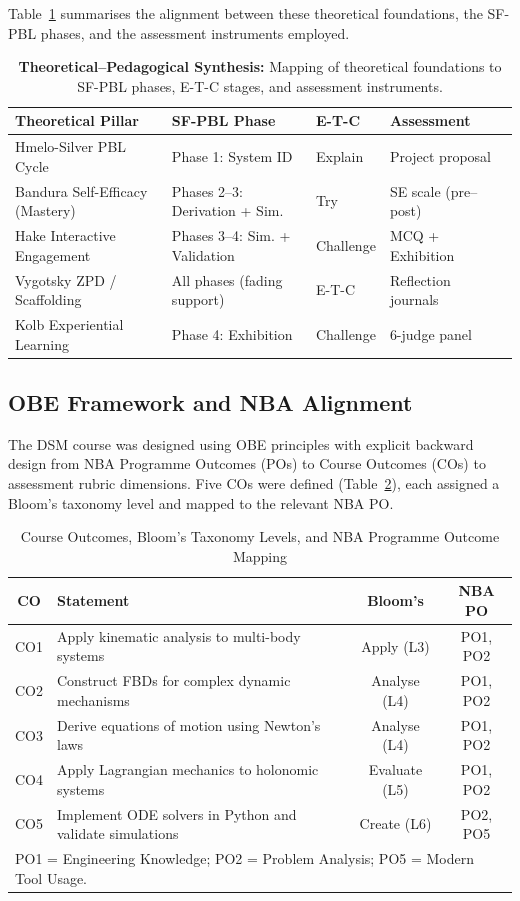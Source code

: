 \documentclass[utf8]{FrontiersinHarvard}
\begin{document}
{\color{blue} Table~\ref{tab:synthesis} summarises the alignment between these theoretical
foundations, the SF-PBL phases, and the assessment instruments employed.}

\begin{table}[h]
\caption{\textbf{Theoretical--Pedagogical Synthesis:} Mapping of theoretical
foundations to SF-PBL phases, E-T-C stages, and assessment instruments.}
\label{tab:synthesis}
\begin{tabular}{lllll}
\toprule
\textbf{Theoretical Pillar} & \textbf{SF-PBL Phase} & \textbf{E-T-C} & \textbf{Assessment} \\
\midrule
Hmelo-Silver PBL Cycle         & Phase 1: System ID       & Explain   & Project proposal  \\
Bandura Self-Efficacy (Mastery) & Phases 2--3: Derivation + Sim. & Try & SE scale (pre--post) \\
Hake Interactive Engagement    & Phases 3--4: Sim. + Validation & Challenge & MCQ + Exhibition  \\
Vygotsky ZPD / Scaffolding     & All phases (fading support)    & E-T-C     & Reflection journals \\
Kolb Experiential Learning     & Phase 4: Exhibition            & Challenge & 6-judge panel      \\
\bottomrule
\end{tabular}
\end{table}

\subsection{OBE Framework and NBA Alignment}

The DSM course was designed using OBE principles \citep{spady1994outcome}
with explicit backward design from NBA Programme Outcomes (POs) to Course
Outcomes (COs) to assessment rubric dimensions. Five COs were defined
(Table~\ref{tab:cos}), each assigned a Bloom's taxonomy level and mapped to
the relevant NBA PO.

\begin{table}[h]
\caption{Course Outcomes, Bloom's Taxonomy Levels, and NBA Programme Outcome Mapping}
\label{tab:cos}
\begin{tabular}{clcc}
\toprule
\textbf{CO} & \textbf{Statement} & \textbf{Bloom's} & \textbf{NBA PO} \\
\midrule
CO1 & Apply kinematic analysis to multi-body systems            & Apply (L3)    & PO1, PO2 \\
CO2 & Construct FBDs for complex dynamic mechanisms             & Analyse (L4)  & PO1, PO2 \\
CO3 & Derive equations of motion using Newton's laws            & Analyse (L4)  & PO1, PO2 \\
CO4 & Apply Lagrangian mechanics to holonomic systems           & Evaluate (L5) & PO1, PO2 \\
CO5 & Implement ODE solvers in Python and validate simulations  & Create (L6)   & PO2, PO5 \\
\bottomrule
\multicolumn{4}{l}{\small PO1 = Engineering Knowledge; PO2 = Problem Analysis; PO5 = Modern Tool Usage.}
\end{tabular}
\end{table}
\end{document}
